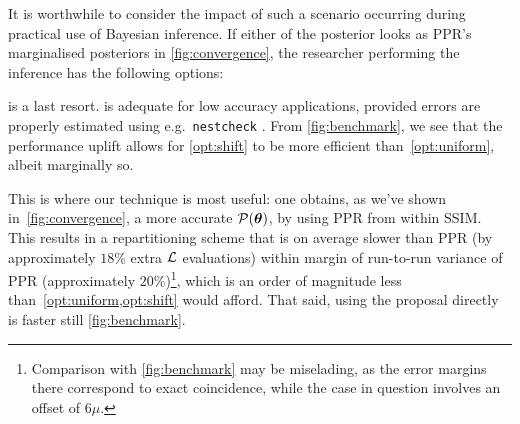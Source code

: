\documentclass[usenatbib]{mnras}
\begin{document}
It is worthwhile to consider the impact of such a scenario occurring
during practical use of Bayesian inference. If either of the posterior
looks as PPR's marginalised posteriors in \cref{fig:convergence}, the
researcher performing the inference has the following options:
 is a last resort.  is
adequate for low accuracy applications, provided errors are properly
estimated using e.g.~\texttt{nestcheck} \citep{higson2018nestcheck}.
From \cref{fig:benchmark}, we see that the performance uplift allows
for \cref{opt:shift} to be more efficient than~\ref{opt:uniform},
albeit marginally so.

This is where our technique is most useful: one obtains, as we've
shown in~\cref{fig:convergence}, a more accurate
\({\cal P}(\bm{\theta})\), by using PPR from within SSIM. This results
in a repartitioning scheme that is on average slower than PPR (by
approximately \(18\%\) extra \({\cal L}\) evaluations) within margin
of run-to-run variance of PPR (approximately
\(20\%\))\footnote{Comparison with \cref{fig:benchmark} may be
  miselading, as the error margins there correspond to exact
  coincidence, while the case in question involves an offset of
  $6\mu$. }, which is an order of magnitude less
than~\vref{opt:uniform,opt:shift} would afford. That said, using the
proposal directly is faster still \cref{fig:benchmark}.
\end{document}
